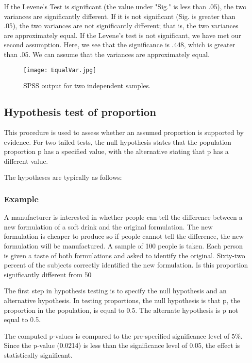 \documentclass[12pt, a4paper]{report}
\begin{document}
If the Levene's Test is significant (the value under "Sig." is less than .05), the two variances are significantly different. If it is not significant (Sig. is greater than .05), the two variances are not significantly different; that is, the two variances are approximately equal. If the Levene's test is not significant, we have met our second assumption. Here, we see that the significance is .448, which is greater than .05. We can assume that the variances are approximately equal.


\begin{figure}[h!]
\begin{center}
  \texttt{[image: EqualVar.jpg]}
  \caption{SPSS output for two independent samples.}\label{EqualVar}
\end{center}
\end{figure}


\subsection{Hypothesis test of proportion}
This procedure is used to assess whether an assumed proportion is supported by evidence. For two tailed tests, the null hypothesis states that the population proportion  p has a specified value, with the alternative stating that p has a different value.

The hypotheses are typically as follows:

\subsubsection{Example}
A manufacturer is interested in whether people can tell the difference between a new formulation of a soft drink and the original formulation. The new formulation is cheaper to produce so if people cannot tell the difference, the new formulation will be manufactured. A sample of 100 people is taken. Each person is given a taste of both formulations and asked to identify the original. Sixty-two percent of the subjects correctly identified the new formulation. Is this proportion significantly different from 50%

The first step in hypothesis testing is to specify the null hypothesis and an alternative hypothesis. In testing proportions, the null hypothesis is that p, the proportion in the population, is equal to 0.5. The alternate hypothesis is p not equal to 0.5.

The computed p-values is compared to the pre-specified significance level of 5\%. Since the p-value (0.0214) is less than the significance level of 0.05, the effect is statistically significant.
\end{document}
